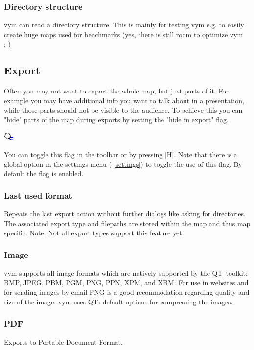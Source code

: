 \documentclass[12pt,a4paper]{article}
\newcommand{\vym}{{\sc vym }}
\newcommand{\key}[1]{[#1]}
\begin{document}
\subsubsection{Directory structure}
\vym can read a directory structure. This is mainly for
testing \vym e.g. to easily create huge maps used for benchmarks (yes,
there is still room to optimize \vym ;-)

\subsection{Export}  \label{export}
\label{hideexport}
Often you may not want to export the whole map, but just parts of it.
For example you may have additional info you want to talk about in a
presentation, while those parts should not be visible to the audience.
To achieve this you can "hide" parts of the map during exports by
setting the "hide in export" flag.
\begin{center}
    \includegraphics[width=0.5cm]{images/flag-hideexport.png}
\end{center}
You can toggle this flag in the toolbar or by pressing \key{H}.  Note
that there is a global option in the settings menu ( \ref{settings}) to
toggle the use of this flag. By default the flag is enabled.

\subsubsection{Last used format}
Repeats the last export action without further dialogs like asking for
directories. The associated export type and filepaths are stored within
the map and thus map specific. Note: Not all export types support this
feature yet.

\subsubsection{Image}
\vym supports all image formats which are natively supported by the
QT~toolkit:
BMP, JPEG, PBM, PGM, PNG, PPN, XPM, and XBM.
For use in websites and for sending images by email PNG is a good
recommodation regarding quality and size of the image. \vym uses QTs
default options for compressing the images.

\subsubsection{PDF}
Exports to Portable Document Format.
\end{document}
